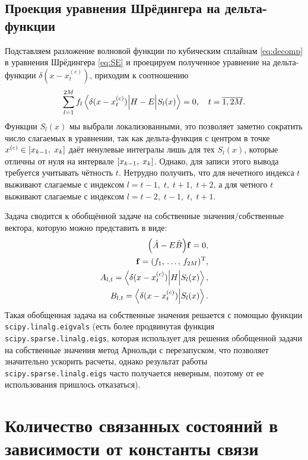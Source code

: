 \documentclass[10pt]{article}
\begin{document}
\subsection{Проекция уравнения Шрёдингера на дельта-функции}

Подставляем разложение волновой функции по кубическим сплайнам \eqref{eq:decomp} в уравнения Шрёдингера \eqref{eq:SE} и проецируем полученное уравнение на дельта-функции $\delta(x-x^{(c)}_t)$, приходим к соотношению
\begin{equation}
    \sum\limits_{l=1}^{2M} f_{l}
    \mel**{\delta(x-x^{(c)}_t)}{H-E}{S_{l}(x)}=0,\quad t=\overline{1,2M}.
\end{equation}
Функции $S_l(x)$ мы выбрали локализованными, это позволяет заметно сократить число слагаемых в уравнении, так как дельта-функция с центром в точке $x^{(c)}\in\qty[x_{k-1},\;x_{k}]$ даёт ненулевые интегралы лишь для тех $S_l(x)$, которые отличны от нуля на интервале $\qty[x_{k-1},\;x_{k}]$. Однако, для записи этого вывода требуется учитывать чётность $t$. Нетрудно получить, что для нечетного индекса $t$ выживают слагаемые с индексом $l=t-1,\;t,\;t+1,\;t+2$, а для четного $t$ выживают слагаемые с индексом $l=t-2,\;t-1,\;t,\;t+1$.

Задача сводится к обобщённой задаче на собственные значения/собственные вектора, которую можно представить в виде:
\begin{equation}
 \begin{split}
  \qty(\hat A - E \hat B) \vb{f} = 0,\\
  \vb{f} = (f_1,\, \ldots,\, f_{2M})^\textrm{T},\\
  A_{l,t} = \mel**{\delta(x-x^{(c)}_t)}{H}{S_{l}(x)},\\
  B_{l,t} = \braket{\delta(x-x^{(c)}_t)}{S_{l}(x)}.
 \end{split}
\end{equation}
Такая обобщенная задача на собственные значения решается с помощью функции \texttt{scipy.linalg.eigvals} (есть более продвинутая функция \texttt{scipy.sparse.linalg.eigs}, которая использует для решения обобщенной задачи на собственные значения метод Арнольди с перезапуском, что позволяет значительно ускорить расчеты, однако результат работы \texttt{scipy.sparse.linalg.eigs} часто получается неверным, поэтому от ее использования пришлось отказаться).

\section{Количество связанных состояний в зависимости от константы связи}
\end{document}
